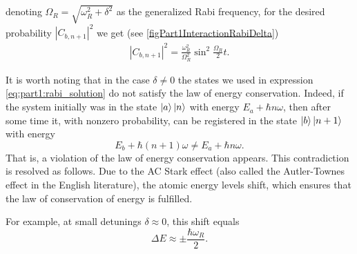 denoting $\Omega_R = \sqrt{\omega_R^2 + \delta^2}$ as
the generalized Rabi frequency, for the desired probability
$\left|C_{b,n+1}\right|^2$ we get (see \autoref{figPart1InteractionRabiDelta})
\begin{eqnarray}
  \left|C_{b,n+1}\right|^2 =  \frac{\omega_R^2}{\Omega_R^2}
  \sin^2{\frac{\Omega_R}{2} t}.
  \label{eqPart1InteractionRabiProbability}
\end{eqnarray}



\begin{remark}
  It is worth noting that in the case $\delta \ne 0$ the states we
  used in expression \ref{eq:part1:rabi_solution} do not
  satisfy the law of energy conservation. Indeed, if the system
  initially was in the state $\ket{a}\ket{n}$ with
  energy $E_a + \hbar n \omega$, then after some time it,
  with nonzero probability,
  can
  be registered in the state
  $\ket{b}\ket{n+1}$ with energy
  \[
  E_b + \hbar (n+1)
  \omega \ne E_a + \hbar n \omega.
  \]
  That is, a violation of the law of
  energy conservation appears. This contradiction is resolved as follows. Due to the AC Stark effect
  (also called the Autler-Townes effect in the English literature)\cite{wiki:autler_townes_effect},
  the atomic energy levels shift, 
  which ensures that the law of conservation of energy is fulfilled.

  For example,
  at small detunings $\delta \approx 0$, this shift equals
  \cite{wiki:autler_townes_effect} 
  \[
  \Delta E \approx \pm \frac{\hbar \omega_R}{2}.
  \]
\end{remark}